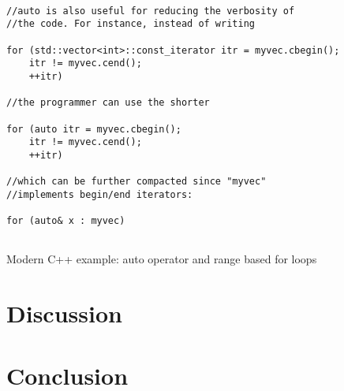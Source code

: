 \documentclass[conference, a4paper]{IEEEtran}
\begin{document}
\begin{listing}[H]
\begin{verbatim}

//auto is also useful for reducing the verbosity of
//the code. For instance, instead of writing

for (std::vector<int>::const_iterator itr = myvec.cbegin();
    itr != myvec.cend();
    ++itr)

//the programmer can use the shorter

for (auto itr = myvec.cbegin();
    itr != myvec.cend();
    ++itr)

//which can be further compacted since "myvec"
//implements begin/end iterators:

for (auto& x : myvec)
        
    \end{verbatim}

    \caption{Modern C++ example: auto operator and range based for loops \cite{C++11_2021}}
\label{listing:2}
\end{listing}

\section{Discussion}

\section{Conclusion}

\clearpage



\end{document}
